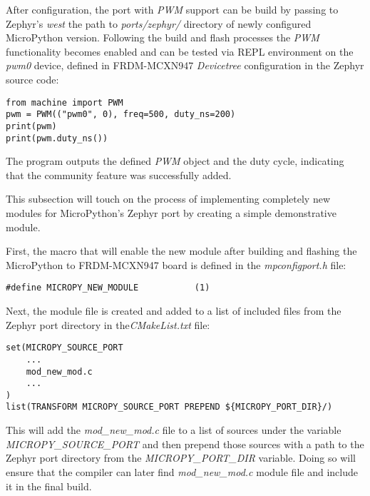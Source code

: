 \documentclass[twoside, 12pt]{article}
\begin{document}
After configuration, the port with \textit{PWM} support can be build by passing to Zephyr's
\textit{west} the path to \textit{ports/zephyr/} directory of newly configured MicroPython 
version. Following the build and flash processes the \textit{PWM} functionality becomes 
enabled and can be tested via REPL environment on the \textit{pwm0} device, defined in FRDM-MCXN947 \textit{Devicetree} configuration in the Zephyr source code:
\begin{lstlisting}[caption=Testing PWM in REPL environment of the Zephyr MicroPython port, breaklines=true]
from machine import PWM
pwm = PWM(("pwm0", 0), freq=500, duty_ns=200)
print(pwm)
print(pwm.duty_ns())
\end{lstlisting}
The program outputs the defined \textit{PWM} object and the duty cycle, indicating that
the community feature was successfully added.

This subsection will touch on the process of implementing completely new modules for
MicroPython's Zephyr port by creating a simple demonstrative module.

First, the macro that will enable the new module after building and flashing the MicroPython 
to FRDM-MCXN947 board is defined in the \textit{mpconfigport.h} file:
\begin{lstlisting}[caption={Implementing a new module for the Zephyr port, Part 1},breaklines=true]
#define MICROPY_NEW_MODULE           (1)
\end{lstlisting}

Next, the module file is created and added to a list of included files from the Zephyr port 
directory in the\textit{CMakeList.txt} file:
\begin{lstlisting}[caption={Implementing a new module for the Zephyr port, Part 2},breaklines=true]
set(MICROPY_SOURCE_PORT
    ...
    mod_new_mod.c
    ...
)
list(TRANSFORM MICROPY_SOURCE_PORT PREPEND ${MICROPY_PORT_DIR}/)  
\end{lstlisting}
This will add the \textit{mod\_new\_mod.c} file to a list of sources under the variable 
\textit{MICROPY\_SOURCE\_PORT} and then prepend those sources with a path to the Zephyr port 
directory from the \textit{MICROPY\_PORT\_DIR} variable. Doing so will ensure that the 
compiler can later find \textit{mod\_new\_mod.c} module file and include it in the final 
build.\cite{swidzinski_cmake}
\end{document}
